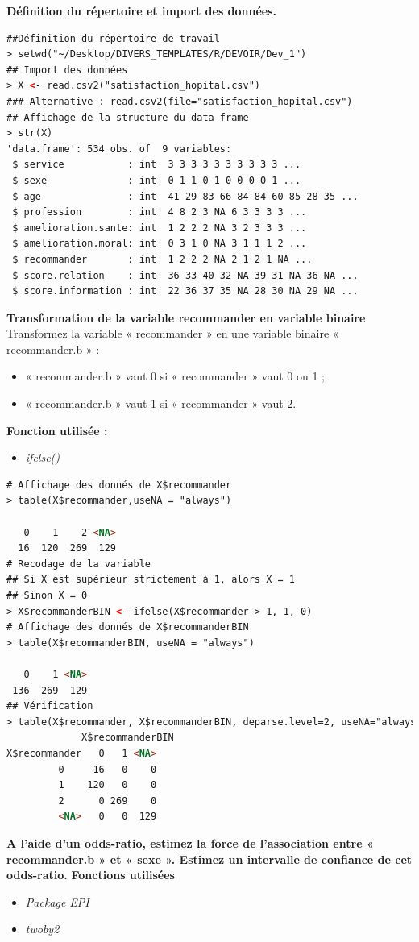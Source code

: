 \textbf{Définition du répertoire et import des données.}

\begin{lstlisting}[language=html]
##Définition du répertoire de travail 
> setwd("~/Desktop/DIVERS_TEMPLATES/R/DEVOIR/Dev_1")
## Import des données 
> X <- read.csv2("satisfaction_hopital.csv")
### Alternative : read.csv2(file="satisfaction_hopital.csv")
## Affichage de la structure du data frame
> str(X)
'data.frame': 534 obs. of  9 variables:
 $ service           : int  3 3 3 3 3 3 3 3 3 3 ...
 $ sexe              : int  0 1 1 0 1 0 0 0 0 1 ...
 $ age               : int  41 29 83 66 84 84 60 85 28 35 ...
 $ profession        : int  4 8 2 3 NA 6 3 3 3 3 ...
 $ amelioration.sante: int  1 2 2 2 NA 3 2 3 3 3 ...
 $ amelioration.moral: int  0 3 1 0 NA 3 1 1 1 2 ...
 $ recommander       : int  1 2 2 2 NA 2 1 2 1 NA ...
 $ score.relation    : int  36 33 40 32 NA 39 31 NA 36 NA ...
 $ score.information : int  22 36 37 35 NA 28 30 NA 29 NA ...
\end{lstlisting}

\textbf{Transformation de la variable recommander en variable binaire}
Transformez la variable « recommander » en une variable binaire « recommander.b » :
\begin{itemize}
\item « recommander.b » vaut 0 si « recommander » vaut 0 ou 1 ;
\item « recommander.b » vaut 1 si « recommander » vaut 2.
\end{itemize}
\textbf{Fonction utilisée : }
\begin{itemize}
\item \textit{ifelse()}
\end{itemize}
\begin{lstlisting}[language=html]
# Affichage des donnés de X$recommander
> table(X$recommander,useNA = "always")

   0    1    2 <NA> 
  16  120  269  129 
# Recodage de la variable 
## Si X est supérieur strictement à 1, alors X = 1
## Sinon X = 0
> X$recommanderBIN <- ifelse(X$recommander > 1, 1, 0)
# Affichage des donnés de X$recommanderBIN
> table(X$recommanderBIN, useNA = "always")

   0    1 <NA> 
 136  269  129 
## Vérification 
> table(X$recommander, X$recommanderBIN, deparse.level=2, useNA="always")
             X$recommanderBIN
X$recommander   0   1 <NA>
         0     16   0    0
         1    120   0    0
         2      0 269    0
         <NA>   0   0  129

\end{lstlisting}
\textbf{A l'aide d'un odds-ratio, estimez la force de l'association entre « recommander.b » et « sexe ». Estimez un intervalle de confiance de cet odds-ratio.}\newline
\textbf{Fonctions utilisées}
\begin{itemize}
\item \textit{Package EPI}
\item \textit{twoby2}
\end{itemize}

